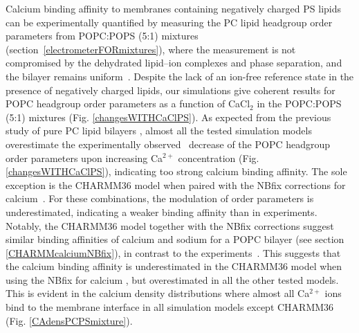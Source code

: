 \documentclass[journal=jpcbfk,manuscript=article]{achemso}
\begin{document}
Calcium binding affinity to membranes containing negatively charged PS lipids can be
experimentally quantified by measuring the PC lipid headgroup order parameters
from POPC:POPS (5:1) mixtures (section~\ref{electrometerFORmixtures}),
where the measurement is not compromised by the dehydrated lipid--ion complexes and phase separation, and the bilayer remains uniform~\cite{feigenson86,mattai89,roux90,roux91}.
Despite the lack of an ion-free reference state
in the presence of negatively charged lipids, our simulations give
coherent results for POPC headgroup order parameters as a function of
CaCl$_2$ in the POPC:POPS (5:1) mixtures (Fig. \ref{changesWITHCaClPS}).
As expected from the previous study of pure PC lipid
bilayers \cite{catte16}, almost all the tested simulation models overestimate the
experimentally observed~\cite{roux90} decrease of the POPC headgroup order parameters upon increasing Ca$^{2+}$ concentration (Fig. \ref{changesWITHCaClPS}),
indicating too strong calcium binding affinity.
The sole exception is the CHARMM36 model when paired with the NBfix
corrections for calcium~\cite{kim16,han2018graph}. For these combinations, the modulation of order parameters is underestimated, 
indicating a weaker binding affinity than in experiments.
Notably, the CHARMM36 model together with the NBfix corrections \cite{venable13,kim16} suggest similar binding affinities of
calcium and sodium for a POPC bilayer (see section \ref{CHARMMcalciumNBfix}), in contrast to the experiments~\cite{cevc90,akutsu81,altenbach84}. This suggests that the calcium binding affinity
is underestimated in the CHARMM36 model when using the NBfix for calcium \cite{kim16,han2018graph}, but overestimated 
in all the other tested models. This is evident in the calcium density distributions where almost all Ca$^{2+}$ ions bind to the membrane interface in all simulation models except CHARMM36 (Fig. \ref{CAdensPCPSmixture}).
\end{document}
